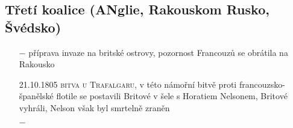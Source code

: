 \documentclass{article}
\begin{document}
\subsection*{Třetí koalice (ANglie, Rakouskom Rusko, Švédsko)}
\begin{itemize}
    \vspace{-0.5em}
    \setlength\itemsep{0.15em}
    \item[$-$] příprava invaze na britské ostrovy, pozornost Francouzů se obrátila na Rakousko
    \item[21.10.1805] \textsc{bitva u Trafalgaru}, v této námořní bitvě proti francouzsko-španělské flotile se postavili Britové v šele s Horatiem Nelsonem, Britové vyhráli, Nelson však byl smrtelně zraněn
    \item[$-$] 
\end{itemize}
\end{document}
